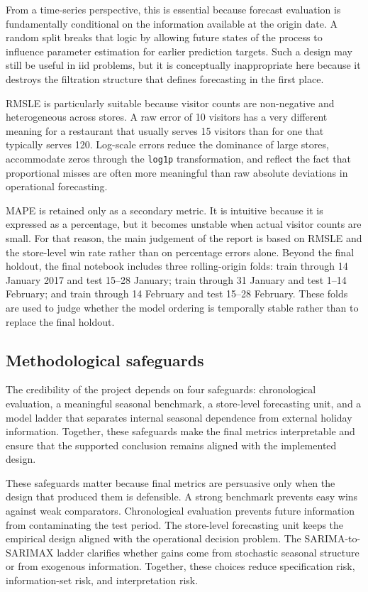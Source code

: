 \documentclass[11pt,oneside]{scrartcl}
\begin{document}
From a time-series perspective, this is essential because forecast evaluation is fundamentally conditional on the information available at the origin date. A random split breaks that logic by allowing future states of the process to influence parameter estimation for earlier prediction targets. Such a design may still be useful in iid problems, but it is conceptually inappropriate here because it destroys the filtration structure that defines forecasting in the first place.

RMSLE is particularly suitable because visitor counts are non-negative and heterogeneous across stores. A raw error of 10 visitors has a very different meaning for a restaurant that usually serves 15 visitors than for one that typically serves 120. Log-scale errors reduce the dominance of large stores, accommodate zeros through the \texttt{log1p} transformation, and reflect the fact that proportional misses are often more meaningful than raw absolute deviations in operational forecasting.

MAPE is retained only as a secondary metric. It is intuitive because it is expressed as a percentage, but it becomes unstable when actual visitor counts are small. For that reason, the main judgement of the report is based on RMSLE and the store-level win rate rather than on percentage errors alone. Beyond the final holdout, the final notebook includes three rolling-origin folds: train through 14 January 2017 and test 15--28 January; train through 31 January and test 1--14 February; and train through 14 February and test 15--28 February. These folds are used to judge whether the model ordering is temporally stable rather than to replace the final holdout.

\subsection{Methodological safeguards}
The credibility of the project depends on four safeguards: chronological evaluation, a meaningful seasonal benchmark, a store-level forecasting unit, and a model ladder that separates internal seasonal dependence from external holiday information. Together, these safeguards make the final metrics interpretable and ensure that the supported conclusion remains aligned with the implemented design.

These safeguards matter because final metrics are persuasive only when the design that produced them is defensible. A strong benchmark prevents easy wins against weak comparators. Chronological evaluation prevents future information from contaminating the test period. The store-level forecasting unit keeps the empirical design aligned with the operational decision problem. The SARIMA-to-SARIMAX ladder clarifies whether gains come from stochastic seasonal structure or from exogenous information. Together, these choices reduce specification risk, information-set risk, and interpretation risk.
\end{document}
